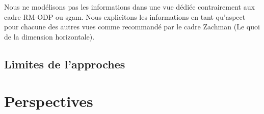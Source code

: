 Nous ne modélisons pas les informations dans une vue dédiée contrairement aux
cadre RM-ODP ou \gls{sgam}. Nous explicitons les informations en tant qu'aspect
pour chacune des autres vues comme recommandé par le cadre Zachman (Le quoi de
la dimension horizontale).

    \subsection{Limites de l'approches}

\section{Perspectives}

